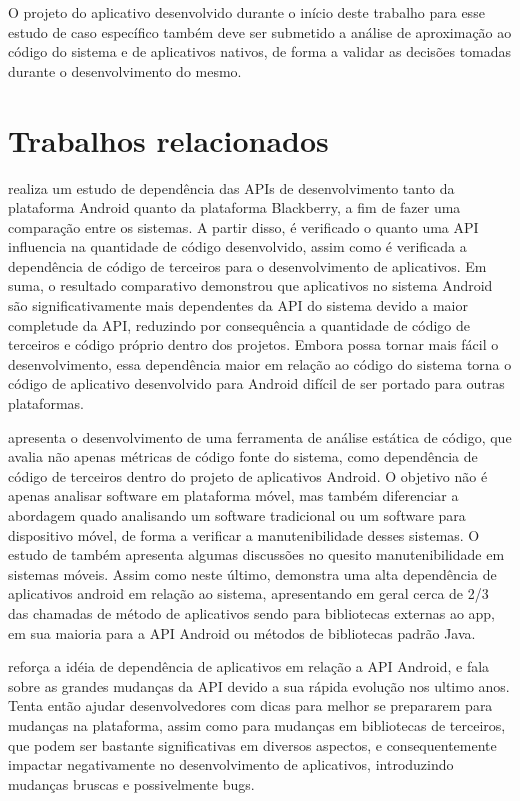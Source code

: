 O projeto do aplicativo desenvolvido durante o início deste trabalho para esse estudo de caso específico também deve ser submetido a análise de aproximação ao código do sistema e de aplicativos nativos, de forma a validar as decisões tomadas durante o desenvolvimento do mesmo.

\section{Trabalhos relacionados}

  realiza um estudo de dependência das APIs de desenvolvimento tanto da plataforma Android quanto da plataforma Blackberry, a fim de fazer uma comparação entre os sistemas. A partir disso, é verificado o quanto uma API influencia na quantidade de código desenvolvido, assim como é verificada a dependência de código de terceiros para o desenvolvimento de aplicativos. Em suma, o resultado comparativo demonstrou que aplicativos no sistema Android são significativamente mais dependentes da API do sistema devido a maior completude da API, reduzindo por consequência a quantidade de código de terceiros e código próprio dentro dos projetos. Embora possa tornar mais fácil o desenvolvimento, essa dependência maior em relação ao código do sistema torna o código de aplicativo desenvolvido para Android difícil de ser portado para outras plataformas.

 apresenta o desenvolvimento de uma ferramenta de análise estática de código, que avalia não apenas métricas de código fonte do sistema, como dependência de código de terceiros dentro do projeto de aplicativos Android. O objetivo não é apenas analisar software em plataforma móvel, mas também diferenciar a abordagem quado analisando um software tradicional ou um software para dispositivo móvel, de forma a verificar a manutenibilidade desses sistemas. O estudo de  também apresenta algumas discussões no quesito manutenibilidade em sistemas móveis. Assim como neste último,  demonstra uma alta dependência de aplicativos android em relação ao sistema, apresentando em geral cerca de  2/3 das chamadas de método de aplicativos sendo para bibliotecas externas ao app, em sua maioria para a API Android ou métodos de bibliotecas padrão Java.

 reforça a idéia de dependência de aplicativos em relação a API Android, e fala sobre as grandes mudanças da API devido a sua rápida evolução nos ultimo anos. Tenta então ajudar desenvolvedores com dicas para melhor se prepararem para mudanças na plataforma, assim como para mudanças em bibliotecas de terceiros, que podem ser bastante significativas em diversos aspectos, e consequentemente impactar negativamente no desenvolvimento de aplicativos, introduzindo mudanças bruscas e possivelmente bugs.

